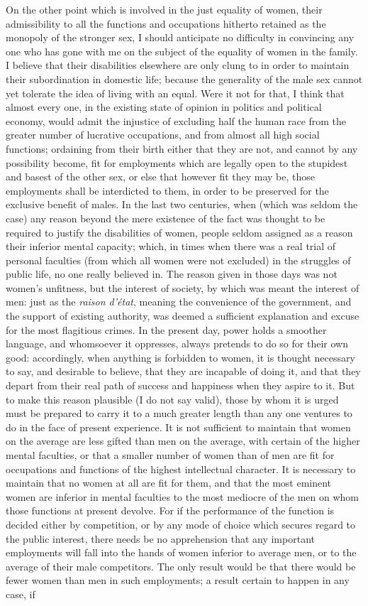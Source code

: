 \documentclass[12pt]{report}
\begin{document}
On the other point which is involved in the just equality of women, their admissibility to all the functions and occupations hitherto retained as the monopoly of the stronger sex, I should anticipate no difficulty in convincing any one who has gone with me on the subject of the equality of women in the family. I believe that their disabilities elsewhere are only clung to in order to maintain their subordination in domestic life; because the generality of the male sex cannot yet tolerate the idea of living with an equal. Were it not for that, I think that almost every one, in the existing state of opinion in politics and political economy, would admit the injustice of excluding half the human race from the greater number of lucrative occupations, and from almost all high social functions; ordaining from their birth either that they are not, and cannot by any possibility become, fit for employments which are legally open to the stupidest and basest of the other sex, or else that however fit they may be, those employments shall be interdicted to them, in order to be preserved for the exclusive benefit of males. In the last two centuries, when (which was seldom the case) any reason beyond the mere existence of the fact was thought to be required to justify the disabilities of women, people seldom assigned as a reason their inferior mental capacity; which, in times when there was a real trial of personal faculties (from which all women were not excluded) in the struggles of public life, no one really believed in. The reason given in those days was not women's unfitness, but the interest of society, by which was meant the interest of men: just as the \emph{raison d'état}, meaning the convenience of the government, and the support of existing authority, was deemed a sufficient explanation and excuse for the most flagitious crimes. In the present day, power holds a smoother language, and whomsoever it oppresses, always pretends to do so for their own good: accordingly, when anything is forbidden to women, it is thought necessary to say, and desirable to believe, that they are incapable of doing it, and that they depart from their real path of success and happiness when they aspire to it. But to make this reason plausible (I do not say valid), those by whom it is urged must be prepared to carry it to a much greater length than any one ventures to do in the face of present experience. It is not sufficient to maintain that women on the average are less gifted than men on the average, with certain of the higher mental faculties, or that a smaller number of women than of men are fit for occupations and functions of the highest intellectual character. It is necessary to maintain that no women at all are fit for them, and that the most eminent women are inferior in mental faculties to the most mediocre of the men on whom those functions at present devolve. For if the performance of the function is decided either by competition, or by any mode of choice which secures regard to the public interest, there needs be no apprehension that any important employments will fall into the hands of women inferior to average men, or to the average of their male competitors. The only result would be that there would be fewer women than men in such employments; a result certain to happen in any case, if 
\end{document}
